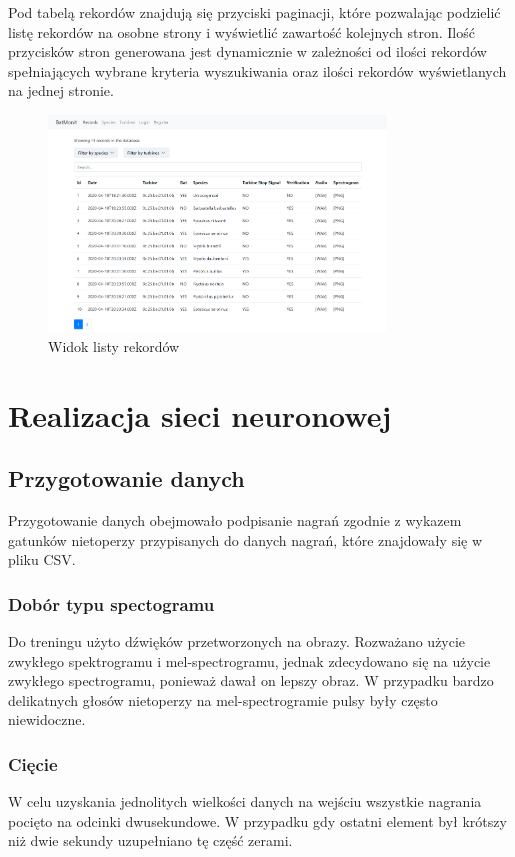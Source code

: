 \documentclass{sprz}
\begin{document}
Pod tabelą rekordów znajdują się przyciski paginacji, które pozwalając podzielić listę rekordów na osobne strony i wyświetlić zawartość kolejnych stron. Ilość przycisków stron generowana jest dynamicznie w zależności od ilości rekordów spełniających wybrane kryteria wyszukiwania oraz ilości rekordów wyświetlanych na jednej stronie.

\begin{figure}[h]
  \centering
  \includegraphics[width=0.8\textwidth]{sprz/app_records}
  \caption{Widok listy rekordów}
  \label{img:app_records}
\end{figure}

\chapter{Realizacja sieci neuronowej}

\section{Przygotowanie danych}
Przygotowanie danych obejmowało podpisanie nagrań zgodnie z wykazem gatunków nietoperzy przypisanych do danych nagrań, które znajdowały się w pliku CSV.

\subsection{Dobór typu spectogramu}
Do treningu użyto dźwięków przetworzonych na obrazy. Rozważano użycie zwykłego spektrogramu i mel-spectrogramu, jednak zdecydowano się na użycie zwykłego spectrogramu, ponieważ dawał on lepszy obraz. W przypadku bardzo delikatnych głosów nietoperzy na mel-spectrogramie pulsy były często niewidoczne.

\subsection{Cięcie}
W celu uzyskania jednolitych wielkości danych na wejściu wszystkie nagrania pocięto na odcinki dwusekundowe. W przypadku gdy ostatni element był krótszy niż dwie sekundy uzupełniano tę część zerami.
\end{document}
